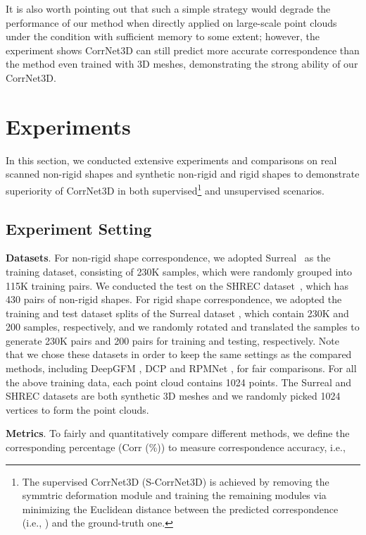 \documentclass[final]{cvpr}
\begin{document}
It is also worth pointing out that such a simple strategy would degrade the performance of our method when directly applied on large-scale point clouds under the condition with sufficient memory to some extent; however, the experiment shows CorrNet3D can still predict more accurate correspondence than the method even trained with 3D meshes, demonstrating the strong ability of our CorrNet3D. 



\section{Experiments}
In this section, we conducted extensive experiments and comparisons on real scanned non-rigid shapes and synthetic non-rigid and rigid shapes to demonstrate superiority of CorrNet3D in both supervised\footnote{The supervised CorrNet3D (S-CorrNet3D) is achieved by removing the symmtric deformation module and training the remaining modules via minimizing the Euclidean distance between the predicted correspondence (i.e., ) and the ground-truth one.} and unsupervised scenarios. 

\subsection{Experiment Setting}


\textbf{Datasets}. For non-rigid shape correspondence, we adopted Surreal~\cite{groueix20183d} as the training dataset, consisting of 230K samples, which were randomly grouped into 115K training pairs. We conducted the test on the SHREC dataset~\cite{donati2020deep}, which has 430 pairs of non-rigid shapes. For rigid shape correspondence, we adopted the training and test dataset splits of the Surreal dataset \cite{groueix20183d}, which  contain 230K and 200 samples, respectively, and we randomly rotated and translated the samples to generate 230K pairs and 200 pairs for training and testing, respectively. Note that we chose these datasets in order to keep the same settings as the compared methods, including DeepGFM \cite{donati2020deep}, DCP \cite{wang2019deep} and RPMNet \cite{yew2020rpm}, for fair comparisons. For all the above training data, each point cloud contains 1024 points.
The Surreal and SHREC datasets are both synthetic 3D meshes  and we randomly picked 1024 vertices to form the point clouds. 



\textbf{Metrics}. To fairly and quantitatively compare different methods, 
we define the corresponding percentage (Corr (\%)) to measure correspondence accuracy, i.e.,  \vspace{-0.25cm}
\end{document}
